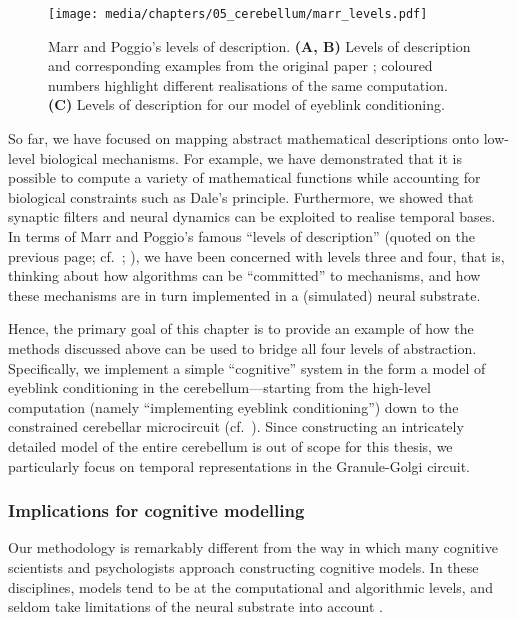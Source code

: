 
\begin{figure}
	\centering
	\texttt{[image: media/chapters/05\_cerebellum/marr\_levels.pdf]}%
	{\label{fig:marr_levels_a}}%
	{\label{fig:marr_levels_b}}%
	{\label{fig:marr_levels_c}}%
	\caption[Marr and Poggio's levels of description]{Marr and Poggio's levels of description.
	\textbf{(A, B)} Levels of description and corresponding examples from the original paper \citep{marr1976understanding}; coloured numbers highlight different realisations of the same computation.
	\textbf{(C)} Levels of description for our model of eyeblink conditioning.
	}
	\label{fig:marr_levels}
\end{figure}

So far, we have focused on mapping abstract mathematical descriptions onto low-level biological mechanisms.
For example, we have demonstrated that it is possible to compute a variety of mathematical functions while accounting for biological constraints such as Dale's principle.
Furthermore, we showed that synaptic filters and neural dynamics can be exploited to realise temporal bases.
In terms of Marr and Poggio's famous \enquote{levels of description} (quoted on the previous page; cf.~; \cite{marr1976understanding}), we have been concerned with levels three and four, that is, thinking about how algorithms can be \enquote{committed} to mechanisms, and how these mechanisms are in turn implemented in a (simulated) neural substrate.

Hence, the primary goal of this chapter is to provide an example of how the methods discussed above can be used to bridge all four levels of abstraction.
Specifically, we implement a simple \enquote{cognitive} system in the form a model of eyeblink conditioning in the cerebellum---starting from the high-level computation (namely \enquote{implementing eyeblink conditioning}) down to the constrained cerebellar microcircuit (cf.~).
Since constructing an intricately detailed model of the entire cerebellum is out of scope for this thesis, we particularly focus on temporal representations in the Granule-Golgi circuit.

\subsubsection{Implications for cognitive modelling}
Our methodology is remarkably different from the way in which many cognitive scientists and psychologists approach constructing cognitive models.
In these disciplines, models tend to be at the computational and algorithmic levels, and seldom take limitations of the neural substrate into account \citep{eliasmith2015marr}.

